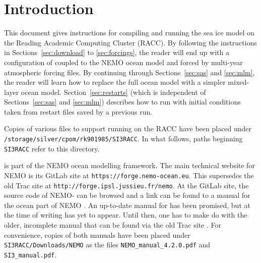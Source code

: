 \section{Introduction}
\label{sec:intro}

This document gives instructions for compiling and running the \SIcu{} sea ice model on the Reading Academic Computing Cluster (RACC).
By following the instructions in Sections~\ref{sec:download} to \ref{sec:forcings}, the reader will end up with a configuration of \SIcu{} coupled to the NEMO ocean model and forced by multi-year atmospheric forcing files.
By continuing through Sections~\ref{sec:sas} and \ref{sec:mlm}, the reader will learn how to replace the full ocean model with a simpler mixed-layer ocean model.
Section~\ref{sec:restarts} (which is independent of Sections~\ref{sec:sas} and \ref{sec:mlm}) describes how to run \SIcu{} with initial conditions taken from restart files saved by a previous run.

Copies of various files to support running \SIcu{} on the RACC have been placed under \verb|/storage/silver/cpom/rk901985/SI3RACC|.
In what follows, paths beginning \verb|SI3RACC| refer to this directory.

\SIcu{} is part of the NEMO ocean modelling framework.
The main technical website for NEMO is its GitLab site at \verb|https://forge.nemo-ocean.eu|.
This supersedes the old Trac site at \verb|http://forge.ipsl.jussieu.fr/nemo|.
At the GitLab site, the source code of NEMO-\SIcu{} can be browsed and a link can be found to a manual for the ocean part of NEMO \citep{nemo-4.2.0}.
An up-to-date manual for \SIcu{} has been promised, but at the time of writing has yet to appear.
Until then, one has to make do with the older, incomplete manual that can be found via the old Trac site \citep{si3-4.0.1}.
For convenience, copies of both manuals have been placed under \verb|SI3RACC/Downloads/NEMO| as the files \verb|NEMO_manual_4.2.0.pdf| and \verb|SI3_manual.pdf|.
